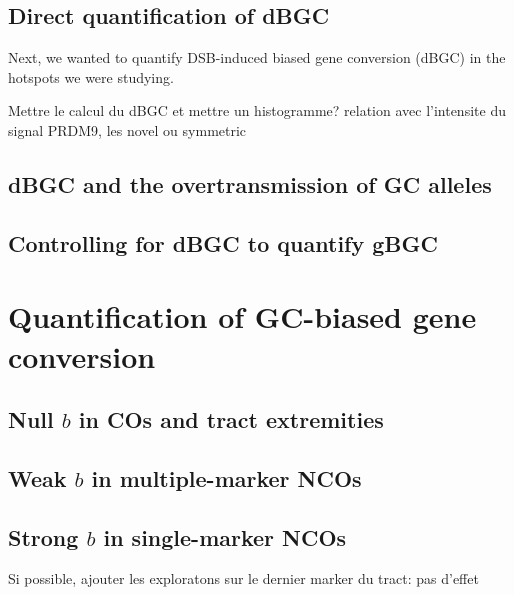 \subsection{Direct quantification of dBGC} 

Next, we wanted to quantify DSB-induced biased gene conversion (dBGC) in the hotspots we were studying.




Mettre le calcul du dBGC et mettre un histogramme? relation avec l'intensite du signal PRDM9, les novel ou symmetric
\subsection{dBGC and the overtransmission of GC alleles}
\subsection{Controlling for dBGC to quantify gBGC}

\section{Quantification of GC-biased gene conversion}
\subsection{Null $b$ in COs and tract extremities}
\subsection{Weak $b$ in multiple-marker NCOs}
\subsection{Strong $b$ in single-marker NCOs}

Si possible, ajouter les exploratons sur le dernier marker du tract: pas d'effet

